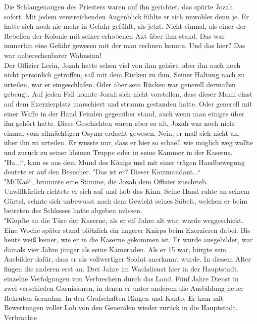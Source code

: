 Die Schlangenaugen des Priesters waren auf ihn gerichtet, das spürte Jozah sofort. Mit jedem 
verstreichenden Augenblick fühlte er sich unwohler denn je. Er hatte sich noch nie mehr in Gefahr 
gefühlt, als jetzt. Nicht einmal, als einer der Rebellen der Kolonie mit seiner erhobenen Axt über 
ihm stand. Das war immerhin eine Gefahr gewesen mit der man rechnen konnte. Und das hier? Das war 
unberechenbarer Wahnsinn!\\
Der Offizier Lerin, Jozah hatte schon viel von ihm gehört, aber ihn auch noch nicht persönlich 
getroffen, saß mit dem Rücken zu ihm. Seiner Haltung nach zu urteilen, war er eingeschlafen. Oder 
aber sein Rücken war generell dermaßen gebeugt. Auf jeden Fall konnte Jozah sich nicht vorstellen, 
dass dieser Mann einst auf dem Exerzierplatz marschiert und stramm gestanden hatte. Oder generell 
mit einer Waffe in der Hand Feinden gegenüber stand, auch wenn man einiges über ihn gehört 
hatte. Diese Geschichten waren aber so alt, Jozah war noch nicht einmal vom allmächtigen Osyma 
erdacht gewesen. Nein, er maß sich nicht an, über ihn zu urteilen. Er wusste nur, dass er hier so 
schnell wie möglich weg wollte und zurück zu seiner kleinen Truppe oder in seine Kammer in der 
Kaserne.\\
"Ha...``, kam es aus dem Mund des Königs und mit einer trägen Handbewegung deutete er auf den 
Besucher. "Das ist er? Dieser Kommandant...``\\
"Mi'Kaé``, brummte eine Stimme, die Jozah dem Offizier zuschrieb. \\
Unwillkürlich richtete er sich auf und hob das Kinn. Seine Hand ruhte an seinem Gürtel, sehnte sich 
unbewusst nach dem Gewicht seines Säbels, welchen er beim betreten des Schlosses hatte abgeben 
müssen.\\
"Klopfte an die Türe der Kaserne, als er elf Jahre alt war, wurde weggeschickt. Eine Woche später 
stand plötzlich ein hagerer Knirps beim Exerzieren dabei. Bis heute weiß keiner, wie er in die 
Kaserne gekommen ist. Er wurde ausgebildet, war damals vier Jahre jünger als seine Kameraden. Als 
er 15 war, bürgte sein Ausbilder dafür, dass er als vollwertiger Soldat anerkannt wurde. In diesem 
Alter fingen die anderen erst an. Drei Jahre im Wachdienst hier in der Hauptstadt, einzelne 
Verfolgungen von Verbrechern durch das Land. Fünf Jahre Dienst in zwei verschieden Garnisionen, in 
denen er unter anderem die Ausbildung neuer Rekruten üernahm. In den Grafschaften Ringen und Kanto. 
Er kam mit Bewertungen voller Lob von den Generälen wieder zurück in die Hauptstadt. Verbrachte 

